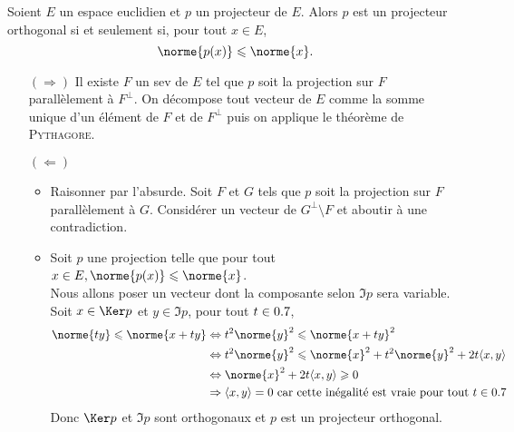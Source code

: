 \begin{prop}{}
    Soient $E$ un espace euclidien et $p$ un projecteur de $E$. Alors $p$ est un projecteur orthogonal si et seulement si, pour tout $x \in E$,
    $$\norme{p(x)} \leqslant \norme{x}.$$
\end{prop}

\begin{preuve}
    \begin{itemize}
        \item[$(\Rightarrow)$] Il existe $F$ un sev de $E$ tel que $p$ soit la projection sur $F$ parallèlement à $F^\perp$. On décompose tout vecteur de $E$ comme la somme unique d'un élément de $F$ et de $F^\perp$ puis on applique le théorème de \textsc{Pythagore}. 
        \item[$(\Leftarrow)$]
        \begin{itemize}
            \item {} Raisonner par l'absurde. Soit $F$ et $G$ tels que $p$ soit la projection sur $F$ parallèlement à $G$. Considérer un vecteur de $G^\perp \setminus F$ et aboutir à une contradiction.
            \item {} Soit $p$ une projection telle que pour tout $x \in E, \norme{p(x)} \leqslant \norme{x}$. \\
            Nous allons poser un vecteur dont la composante selon $\Im p$ sera variable.
            Soit $x \in \Ker p$ et $y \in \Im p$, pour tout $t \in 0.7$, 
            \begin{align*}
                \norme{ty} \leqslant \norme{x + ty} &\Leftrightarrow t^2 \norme{y}^2 \leqslant \norme{x+ty}^2 \\
                &\Leftrightarrow t^2 \norme{y}^2 \leqslant \norme{x}^2 + t^2 \norme{y}^2 + 2t \langle x, y \rangle \\
                &\Leftrightarrow \norme{x}^2 + 2t \langle x, y \rangle \geqslant 0 \\
                &\Rightarrow \langle x, y \rangle = 0 \text{ car cette inégalité est vraie pour tout } t \in \R
            \end{align*}
            Donc $\Ker p$ et $\Im p$ sont orthogonaux et $p$ est un projecteur orthogonal.
        \end{itemize}
    \end{itemize}
\end{preuve}

